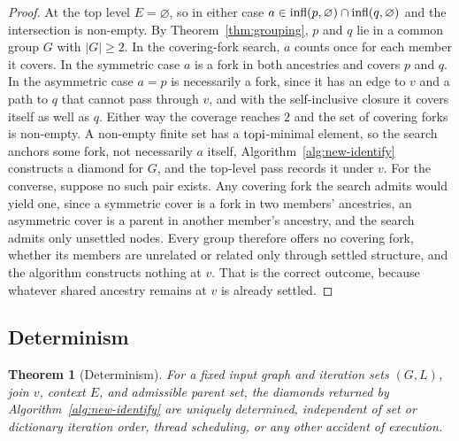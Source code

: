 \documentclass[12pt]{report}
\newtheorem{theorem}{Theorem}
\begin{document}
\begin{proof}
At the top level $E = \varnothing$, so in either case $a \in \mathrm{infl}(p,\varnothing)\cap\mathrm{infl}(q,\varnothing)$ and the intersection is non-empty. By Theorem~\ref{thm:grouping}, $p$ and $q$ lie in a common group $G$ with $|G|\ge 2$. In the covering-fork search, $a$ counts once for each member it covers. In the symmetric case $a$ is a fork in both ancestries and covers $p$ and $q$. In the asymmetric case $a = p$ is necessarily a fork, since it has an edge to $v$ and a path to $q$ that cannot pass through $v$, and with the self-inclusive closure it covers itself as well as $q$. Either way the coverage reaches $2$ and the set of covering forks is non-empty. A non-empty finite set has a $\mathrm{topi}$-minimal element, so the search anchors some fork, not necessarily $a$ itself, Algorithm~\ref{alg:new-identify} constructs a diamond for $G$, and the top-level pass records it under $v$. For the converse, suppose no such pair exists. Any covering fork the search admits would yield one, since a symmetric cover is a fork in two members' ancestries, an asymmetric cover is a parent in another member's ancestry, and the search admits only unsettled nodes. Every group therefore offers no covering fork, whether its members are unrelated or related only through settled structure, and the algorithm constructs nothing at $v$. That is the correct outcome, because whatever shared ancestry remains at $v$ is already settled.
\end{proof}

\subsection{Determinism}

\begin{theorem}[Determinism]
\label{thm:determinism}
For a fixed input graph and iteration sets $(G, L)$, join $v$, context $E$, and admissible parent set, the diamonds returned by Algorithm~\ref{alg:new-identify} are uniquely determined, independent of set or dictionary iteration order, thread scheduling, or any other accident of execution.
\end{theorem}
\end{document}
